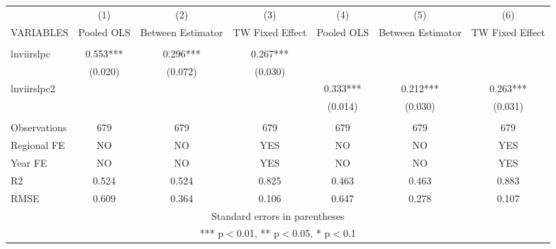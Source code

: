 \documentclass[]{article}
\begin{document}
\begin{tabular}{lcccccc} \hline
 & (1) & (2) & (3) & (4) & (5) & (6) \\
VARIABLES & Pooled OLS & Between Estimator & TW Fixed Effect & Pooled OLS & Between Estimator & TW Fixed Effect \\ \hline
 &  &  &  &  &  &  \\
lnviirslpc & 0.553*** & 0.296*** & 0.267*** &  &  &  \\
 & (0.020) & (0.072) & (0.030) &  &  &  \\
lnviirslpc2 &  &  &  & 0.333*** & 0.212*** & 0.263*** \\
 &  &  &  & (0.014) & (0.030) & (0.031) \\
 &  &  &  &  &  &  \\
Observations & 679 & 679 & 679 & 679 & 679 & 679 \\
Regional FE & NO & NO & YES & NO & NO & YES \\
Year FE & NO & NO & YES & NO & NO & YES \\
R2 & 0.524 & 0.524 & 0.825 & 0.463 & 0.463 & 0.883 \\
 RMSE & 0.609 & 0.364 & 0.106 & 0.647 & 0.278 & 0.107 \\ \hline
\multicolumn{7}{c}{ Standard errors in parentheses} \\
\multicolumn{7}{c}{ *** p$<$0.01, ** p$<$0.05, * p$<$0.1} \\
\end{tabular}
\end{document}
